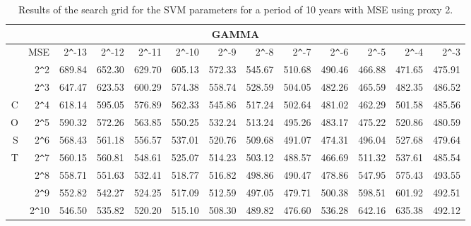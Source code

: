 \begin{table}[h!]
\centering
\begin{adjustbox}{width=\textwidth}
\begin{tabular}{|r|r|rrrrrrrrrrr|}
\hline
\multicolumn{13}{|c|}{GAMMA} \tabularnewline
\hline
 &MSE& 2\verb|^|-13 & 2\verb|^|-12 & 2\verb|^|-11 & 2\verb|^|-10 & 2\verb|^|-9 & 2\verb|^|-8 & 2\verb|^|-7 & 2\verb|^|-6 & 2\verb|^|-5 & 2\verb|^|-4 & 2\verb|^|-3 \\ 
  \hline
  &2\verb|^|2 & 689.84 & 652.30 & 629.70 & 605.13 & 572.33 & 545.67 & 510.68 & 490.46 & 466.88 & 471.65 & 475.91 \\ 
  &2\verb|^|3 & 647.47 & 623.53 & 600.29 & 574.38 & 558.74 & 528.59 & 504.05 & 482.26 & 465.59 & 482.35 & 486.52 \\ 
  C&2\verb|^|4 & 618.14 & 595.05 & 576.89 & 562.33 & 545.86 & 517.24 & 502.64 & 481.02 & 462.29 & 501.58 & 485.56 \\ 
  O&2\verb|^|5 & 590.32 & 572.26 & 563.85 & 550.25 & 532.24 & 513.24 & 495.26 & 483.17 & 475.22 & 520.86 & 480.59 \\ 
  S&2\verb|^|6 & 568.43 & 561.18 & 556.57 & 537.01 & 520.76 & 509.68 & 491.07 & 474.31 & 496.04 & 527.68 & 479.64 \\ 
  T&2\verb|^|7 & 560.15 & 560.81 & 548.61 & 525.07 & 514.23 & 503.12 & 488.57 & 466.69 & 511.32 & 537.61 & 485.54 \\ 
  &2\verb|^|8 & 558.71 & 551.63 & 532.41 & 518.77 & 516.82 & 498.86 & 490.47 & 478.86 & 547.95 & 575.43 & 493.55 \\ 
  &2\verb|^|9 & 552.82 & 542.27 & 524.25 & 517.09 & 512.59 & 497.05 & 479.71 & 500.38 & 598.51 & 601.92 & 492.51 \\ 
  &2\verb|^|10 & 546.50 & 535.82 & 520.20 & 515.10 & 508.30 & 489.82 & 476.60 & 536.28 & 642.16 & 635.38 & 492.12 \\ 
   \hline
\end{tabular}
\end{adjustbox}
\caption{Results of the search grid for the SVM parameters for a period of 10 years with MSE using proxy 2.}
\end{table}